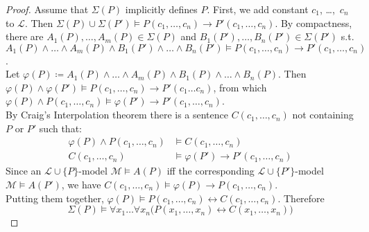 \documentclass[UTF8,11pt,colorlinks,compress,openany]{beamer}%
\begin{document}
\begin{frame}\frametitle{}
\begin{proof}
Assume that $\Sigma(P)$ implicitly defines $P$. First, we add constant $c_1$, \dots,~$c_n$ to $\mathscr{L}$. Then $\Sigma(P) \cup \Sigma(P') \vDash P(c_1, \dots, c_n)\to  P'(c_1, \dots, c_n)$. By compactness, there are $A_1(P),\dots,A_m(P) \in \Sigma(P)$ and $B_1(P'),\dots,B_n(P') \in \Sigma(P')$ s.t. $A_1(P)\wedge\dots\wedge A_m(P)\wedge B_1(P')\wedge\dots\wedge B_n(P') \vDash
P(c_1, \dots, c_n)\to P'(c_1, \dots, c_n)$.\\
Let $\varphi(P)\coloneqq A_1(P)\wedge\dots\wedge A_m(P)\wedge B_1(P)\wedge\dots\wedge B_n(P)$. Then $\varphi(P) \wedge
\varphi(P') \vDash P(c_1, \dots, c_n) \to P'(c_1\dots c_n)$, from which $\varphi(P) \wedge P(c_1, \dots, c_n) \vDash \varphi(P') \to P'(c_1, \dots, c_n)$.\\
By Craig's Interpolation theorem there is a sentence $C(c_1,\dots, c_n)$ not containing $P$ or $P'$ such that:
\begin{align*}
  \varphi(P) \wedge P(c_1, \dots, c_n) & \vDash C(c_1,\dots, c_n) \\
  C(c_1,\dots, c_n) & \vDash \varphi(P') \to P'(c_1, \dots, c_n)
\end{align*}
Since an $\mathscr{L}\cup\{P\}$-model $\mathcal{M}\vDash A(P)$ iff the corresponding $\mathscr{L}\cup\{P'\}$-model $\mathcal{M}\vDash A(P')$, we have
$C(c_1,\dots, c_n) \vDash \varphi(P) \to P(c_1,\dots, c_n)$.\\
Putting them together, $\varphi(P) \vDash P(c_1,\dots, c_n)
\leftrightarrow C(c_1, \dots, c_n)$. Therefore
\[
\Sigma(P) \vDash
\forall x_1\dots\forall x_n\big(P(x_1,\dots, x_n) \leftrightarrow C(x_1,\dots, x_n)\big)
\]
\end{proof}
\end{frame}
\end{document}
